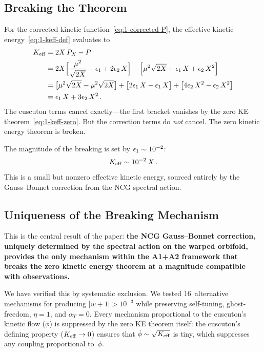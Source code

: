 \subsection{Breaking the Theorem}
\label{sec:1-breaking}

For the corrected kinetic function~\eqref{eq:1-corrected-P}, the effective kinetic energy~\eqref{eq:1-keff-def} evaluates to
\begin{align}
\label{eq:1-keff-broken}
K_{\mathrm{eff}} &= 2X\,P_X - P \notag\\
&= 2X\Bigl[\frac{\mu^2}{\sqrt{2X}} + \epsilon_1 + 2\epsilon_2\, X\Bigr] - \Bigl[\mu^2\sqrt{2X} + \epsilon_1\, X + \epsilon_2\, X^2\Bigr] \notag\\
&= \bigl[\mu^2\sqrt{2X} - \mu^2\sqrt{2X}\bigr] + \bigl[2\epsilon_1\, X - \epsilon_1\, X\bigr] + \bigl[4\epsilon_2\, X^2 - \epsilon_2\, X^2\bigr] \notag\\
&= \epsilon_1\, X + 3\epsilon_2\, X^2\,.
\end{align}
The cuscuton terms cancel exactly---the first bracket vanishes by the zero KE theorem~\eqref{eq:1-keff-zero}. But the correction terms do \emph{not} cancel. The zero kinetic energy theorem is broken.

The magnitude of the breaking is set by $\epsilon_1 \sim 10^{-2}$:
\begin{equation}
\label{eq:1-keff-magnitude}
K_{\mathrm{eff}} \sim 10^{-2}\, X\,.
\end{equation}
This is a small but nonzero effective kinetic energy, sourced entirely by the Gauss--Bonnet correction from the NCG spectral action.

\subsection{Uniqueness of the Breaking Mechanism}
\label{sec:1-uniqueness-breaking}

This is the central result of the paper: \textbf{the NCG Gauss--Bonnet correction, uniquely determined by the spectral action on the warped orbifold, provides the only mechanism within the A1+A2 framework that breaks the zero kinetic energy theorem at a magnitude compatible with observations.}

We have verified this by systematic exclusion. We tested 16~alternative mechanisms for producing $|w + 1| > 10^{-3}$ while preserving self-tuning, ghost-freedom, $\eta = 1$, and $\alpha_T = 0$. Every mechanism proportional to the cuscuton's kinetic flow ($\dot\phi$) is suppressed by the zero KE theorem itself: the cuscuton's defining property ($K_{\mathrm{eff}} \to 0$) ensures that $\dot\phi \sim \sqrt{K_{\mathrm{eff}}}$ is tiny, which suppresses any coupling proportional to~$\dot\phi$.

